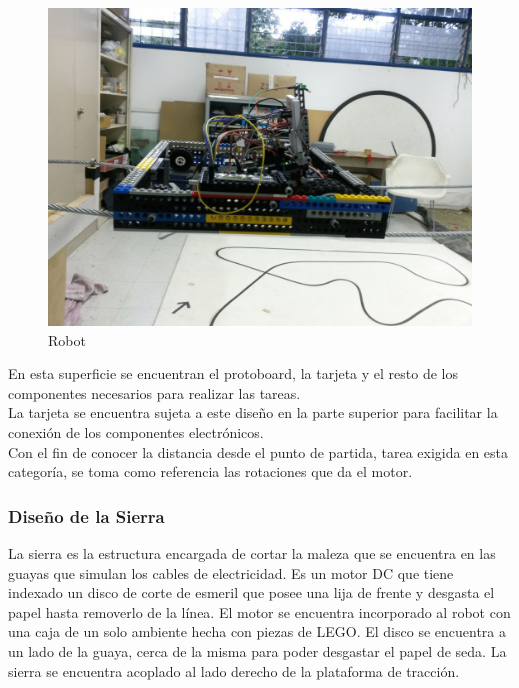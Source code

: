 \documentclass[conference]{IEEEtran}
\begin{document}
\begin{figure}[htp]
	\centering
	\includegraphics[scale=0.15,type=png,ext=.jpg,read=.jpg]{robot}
	\caption{Robot}
	\label{fig:robot}
\end{figure}

En esta superficie se encuentran el protoboard, la tarjeta y el resto de los componentes necesarios para realizar las tareas. \\

La tarjeta se encuentra sujeta a este diseño en la parte superior para facilitar la conexión de los componentes electrónicos.\\

Con el fin de conocer la distancia desde el punto de partida, tarea exigida en esta categoría, se toma como referencia las rotaciones que da el motor. 



\bigskip
\subsubsection{Diseño de la Sierra}

\bigskip

La sierra es la estructura encargada de cortar la maleza que se encuentra en las guayas que simulan los cables de electricidad. Es un motor DC que tiene indexado un disco de corte de esmeril que posee una lija de frente y desgasta el papel hasta removerlo de la línea. El motor se encuentra incorporado al robot con una caja de un solo ambiente hecha con piezas de LEGO\textregistered \vspace{2mm}. El disco se encuentra a un lado de la guaya, cerca de la misma para poder desgastar el papel de seda. La sierra se encuentra acoplado al lado derecho de la plataforma de tracción. \\
\end{document}
